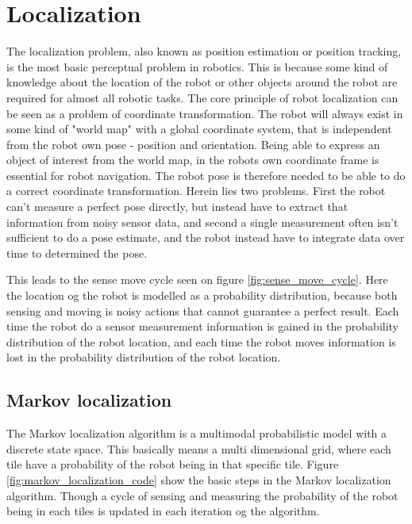 \chapter{Localization}
\label{chp:local}

The localization problem, also known as position estimation or position tracking, is the most basic perceptual problem in robotics.
This is because some kind of knowledge about the location of the robot or other objects around the robot are required for almost all robotic tasks.
The core principle of robot localization can be seen as a problem of coordinate transformation.
The robot will always exist in some kind of "world map" with a global coordinate system, that is independent from the robot own pose - position and orientation.
Being able to express an object of interest from the world map, in the robots own coordinate frame is essential for robot navigation.
The robot pose is therefore needed to be able to do a correct coordinate transformation.
Herein lies two problems.
First the robot can't measure a perfect pose directly, but instead have to extract that information from noisy sensor data, and second a single measurement often isn't sufficient to do a pose estimate, and the robot instead have to integrate data over time to determined the pose.

This leads to the sense move cycle seen on figure \ref{fig:sense_move_cycle}.
Here the location og the robot is modelled as a probability distribution, because both sensing and moving is noisy actions that cannot guarantee a perfect result.
Each time the robot do a sensor measurement information is gained in the probability distribution of the robot location, and each time the robot moves information is lost in the probability distribution of the robot location.


\section{Markov localization}

The Markov localization algorithm is a multimodal probabilistic model with a discrete state space.
This basically means a multi dimensional grid, where each tile have a probability of the robot being in that specific tile.
Figure \ref{fig:markov_localization_code} show the basic steps in the Markov localization algorithm.
Though a cycle of sensing and measuring the probability of the robot being in each tiles is updated in each iteration og the algorithm.

